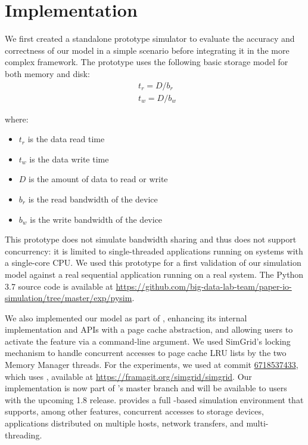 \section{Implementation}

We first created a standalone prototype
simulator to evaluate the accuracy and correctness of our
model in a simple scenario before integrating it in the more complex
\wrench framework.
The prototype uses the following basic storage model for
both memory and disk:
\begin{align*}
    & t_{r} = D / b_r \\
    & t_{w} = D / b_w\
\end{align*}

where:
\begin{itemize}
    \item $t_{r}$ is the data read time
    \item $t_{w}$ is the data write time
    \item $D$ is the amount of data to read or write
    \item $b_r$ is the read bandwidth of the device
    \item $b_w$ is the write bandwidth of the device
\end{itemize}

This prototype does not simulate  bandwidth sharing and thus does not support
concurrency: it is limited to single-threaded applications running on systems
with a single-core CPU. We used this prototype for a first validation of our simulation
model against a real sequential application running on a real system.
The Python 3.7 source code is available at
\url{https://github.com/big-data-lab-team/paper-io-simulation/tree/master/exp/pysim}.

We also implemented our model as part of \wrench, enhancing its
internal implementation and APIs with a page cache abstraction,
and allowing users to activate the feature via a command-line
argument. We used SimGrid's locking mechanism to handle
concurrent accesses to page cache LRU lists by the two Memory
Manager threads. For the experiments, we used
 at commit
\href{https://github.com/wrench-project/wrench/tree/67185374330d2c4bf274fce222c937e838df5b03}{6718537433},
which uses \simgrid 3.25, available at
\url{https://framagit.org/simgrid/simgrid}. Our implementation
is now part of \wrench's master branch and will be available to
users with the upcoming 1.8 release. \wrench provides a full \simgrid-based simulation 
environment that supports, among other features, concurrent accesses to storage devices, 
applications distributed on multiple hosts, network transfers, 
and multi-threading. 